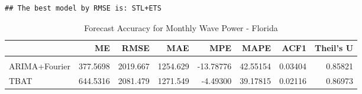 \documentclass[
]{article}
\begin{document}
\begin{verbatim}
## The best model by RMSE is: STL+ETS
\end{verbatim}

\begin{table}[!h]
\centering\centering
\caption{\label{tab:unnamed-chunk-27}Forecast Accuracy for Monthly Wave Power - Florida}
\centering
\begin{tabular}[t]{l|r|r|r|r|r|r|r}
\hline
  & ME & RMSE & MAE & MPE & MAPE & ACF1 & Theil's U\\
\hline
\cellcolor{gray!10}{STL+ETS} & \cellcolor{gray!10}{260.0615} & \cellcolor{gray!10}{1884.797} & \cellcolor{gray!10}{1242.601} & \cellcolor{gray!10}{-22.94636} & \cellcolor{gray!10}{48.47699} & \cellcolor{gray!10}{0.04601} & \cellcolor{gray!10}{0.78809}\\
\hline
ARIMA+Fourier & 377.5698 & 2019.667 & 1254.629 & -13.78776 & 42.55154 & 0.03404 & 0.85821\\
\hline
TBAT & 644.5316 & 2081.479 & 1271.549 & -4.49300 & 39.17815 & 0.02116 & 0.86973\\
\hline
\end{tabular}
\end{table}
\end{document}
